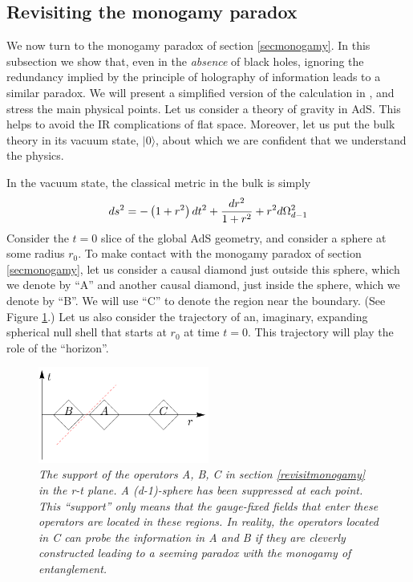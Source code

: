 \documentclass[12pt]{article}
\newcommand{\be}{\begin{equation}}
\newcommand{\ee}{\end{equation}}
\begin{document}
\subsection{Revisiting the monogamy paradox \label{revisitmonogamy}}
We now turn to the monogamy paradox of section \ref{secmonogamy}. In this subsection we show that, even in the {\em absence} of black holes, ignoring the redundancy implied by the principle of holography of information leads to a similar paradox.  We will present a simplified version of the calculation in \cite{Raju:2018zpn}, and stress the main physical points. Let us consider a theory of gravity in AdS. This helps to avoid the  IR complications of flat space. Moreover, let us put the bulk theory in its vacuum state, $|0 \rangle$, about which we are confident that we understand the physics.

In the vacuum state, the classical metric in the bulk is simply
\be
\label{emptyglobalads}
ds^2 = -\left(1+r^2\right) dt^2  +{ dr^2 \over 1+r^2} + r^2 d\Omega_{d-1}^2
\ee
Consider the $t = 0$ slice of the global AdS geometry, and consider a sphere at some radius $r_0$.  To make contact with the monogamy paradox of section \ref{secmonogamy}, let us consider a causal diamond just outside this sphere, which we denote by ``A'' and another causal diamond, just inside the sphere,  which we denote by  ``B''. We will use ``C'' to denote the region near the boundary. (See Figure \ref{monogsupport}.) Let us also consider the trajectory of an, imaginary, expanding spherical null shell that starts at $r_0$ at time $t = 0$. This trajectory  will play the role of the ``horizon''.
\begin{figure}[!ht]
\begin{center}
\includegraphics[width=0.5\textwidth]{toydiagram.pdf}
\caption{\em The support of the operators A, B, C in section \ref{revisitmonogamy} in the r-t plane. A (d-1)-sphere has been suppressed at each point. This ``support'' only means that the gauge-fixed fields that enter these operators are located in these regions. In reality, the operators located in C can probe the information in A and B if they are cleverly constructed leading to a seeming paradox with the monogamy of entanglement. \label{monogsupport}}
\end{center}
\end{figure}
\end{document}
